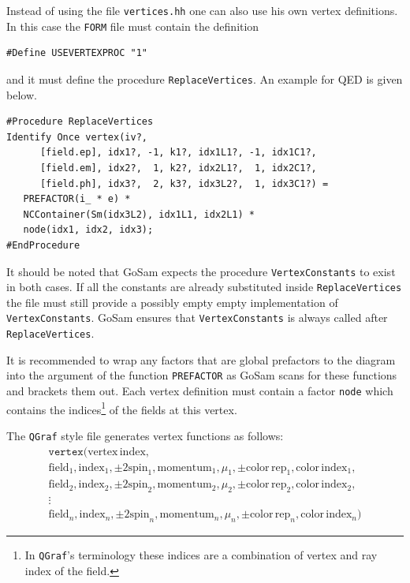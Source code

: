\documentclass[11pt,a4paper]{refrep}
\newcommand{\gosamversion}{{2{.}0}}
\newcommand{\gosamv}[1][\gosamversion]{{\sc GoSam}\xspace}
\newcommand{\qgraf}{{\tt QGraf}\xspace}
\newcommand{\form}{{\tt FORM}\xspace}
\begin{document}
Instead of using the file \texttt{vertices.hh} one can also use
his own vertex definitions. In this case the \form{} file must contain
the definition
\begin{lstlisting}[language=form]
#Define USEVERTEXPROC "1"
\end{lstlisting}
and it must define the procedure \texttt{ReplaceVertices}. An example
for QED is given below.
\begin{maxipage}
\begin{lstlisting}[language=form]
#Procedure ReplaceVertices
Identify Once vertex(iv?,
      [field.ep], idx1?, -1, k1?, idx1L1?, -1, idx1C1?,
      [field.em], idx2?,  1, k2?, idx2L1?,  1, idx2C1?,
      [field.ph], idx3?,  2, k3?, idx3L2?,  1, idx3C1?) =
   PREFACTOR(i_ * e) *
   NCContainer(Sm(idx3L2), idx1L1, idx2L1) *
   node(idx1, idx2, idx3);
#EndProcedure
\end{lstlisting}
\end{maxipage}
It should be noted that \gosamv{} expects the procedure \texttt{VertexConstants}
to exist in both cases. If all the constants are already substituted inside
\texttt{ReplaceVertices} the file must still provide a possibly empty empty
implementation of \texttt{VertexConstants}. \gosamv{} ensures that
\texttt{VertexConstants} is always called after \texttt{ReplaceVertices}.

It is recommended to wrap any factors that are global prefactors to the diagram
into the argument of the function \texttt{PREFACTOR} as \gosamv{} scans for these
functions and brackets them out. Each vertex definition must contain a factor
\texttt{node} which contains the indices\footnote{In \qgraf's terminology
these indices are a combination of vertex and ray index of the field.}
of the fields at this vertex.

The \qgraf{} style file generates vertex functions as follows:
\begin{multline*}
\mathtt{vertex}(\mathrm{vertex\,index},\\
   \mathrm{field}_1, \mathrm{index}_1, \pm2\mathrm{spin}_1, \mathrm{momentum}_1, \mu_1, \pm\mathrm{color\,rep}_1, %
   \mathrm{color\,index}_1,\\
   \mathrm{field}_2, \mathrm{index}_2, \pm2\mathrm{spin}_2, \mathrm{momentum}_2, \mu_2, \pm\mathrm{color\,rep}_2, %
   \mathrm{color\,index}_2,\\
   \vdots\\
   \mathrm{field}_n, \mathrm{index}_n, \pm2\mathrm{spin}_n, \mathrm{momentum}_n, \mu_n, \pm\mathrm{color\,rep}_n, %
   \mathrm{color\,index}_n)
\end{multline*}
\end{document}
